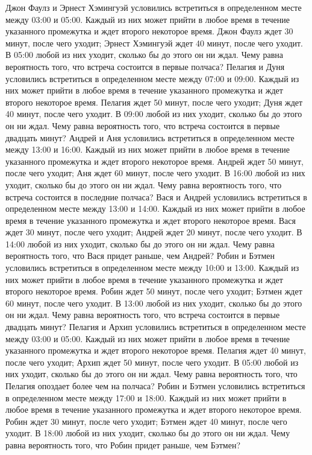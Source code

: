 Джон Фаулз и Эрнест Хэмингуэй условились встретиться в определенном месте между 03:00 и 05:00. Каждый из них может прийти в любое время в течение указанного промежутка и ждет второго некоторое время. Джон Фаулз ждет 30 минут, после чего уходит; Эрнест Хэмингуэй ждет 40 минут, после чего уходит. В 05:00 любой из них уходит, сколько бы до этого он ни ждал. Чему равна вероятность того, что встреча состоится в первые полчаса?
Пелагия и Дуня условились встретиться в определенном месте между 07:00 и 09:00. Каждый из них может прийти в любое время в течение указанного промежутка и ждет второго некоторое время. Пелагия ждет 50 минут, после чего уходит; Дуня ждет 40 минут, после чего уходит. В 09:00 любой из них уходит, сколько бы до этого он ни ждал. Чему равна вероятность того, что встреча состоится в первые двадцать минут?
Андрей и Аня условились встретиться в определенном месте между 13:00 и 16:00. Каждый из них может прийти в любое время в течение указанного промежутка и ждет второго некоторое время. Андрей ждет 50 минут, после чего уходит; Аня ждет 60 минут, после чего уходит. В 16:00 любой из них уходит, сколько бы до этого он ни ждал. Чему равна вероятность того, что встреча состоится в последние полчаса?
Вася и Андрей условились встретиться в определенном месте между 13:00 и 14:00. Каждый из них может прийти в любое время в течение указанного промежутка и ждет второго некоторое время. Вася ждет 30 минут, после чего уходит; Андрей ждет 20 минут, после чего уходит. В 14:00 любой из них уходит, сколько бы до этого он ни ждал. Чему равна вероятность того, что Вася придет раньше, чем Андрей?
Робин и Бэтмен условились встретиться в определенном месте между 10:00 и 13:00. Каждый из них может прийти в любое время в течение указанного промежутка и ждет второго некоторое время. Робин ждет 50 минут, после чего уходит; Бэтмен ждет 60 минут, после чего уходит. В 13:00 любой из них уходит, сколько бы до этого он ни ждал. Чему равна вероятность того, что встреча состоится в первые двадцать минут?
Пелагия и Архип условились встретиться в определенном месте между 03:00 и 05:00. Каждый из них может прийти в любое время в течение указанного промежутка и ждет второго некоторое время. Пелагия ждет 40 минут, после чего уходит; Архип ждет 50 минут, после чего уходит. В 05:00 любой из них уходит, сколько бы до этого он ни ждал. Чему равна вероятность того, что Пелагия опоздает более чем на полчаса?
Робин и Бэтмен условились встретиться в определенном месте между 17:00 и 18:00. Каждый из них может прийти в любое время в течение указанного промежутка и ждет второго некоторое время. Робин ждет 30 минут, после чего уходит; Бэтмен ждет 40 минут, после чего уходит. В 18:00 любой из них уходит, сколько бы до этого он ни ждал. Чему равна вероятность того, что Робин придет раньше, чем Бэтмен?
